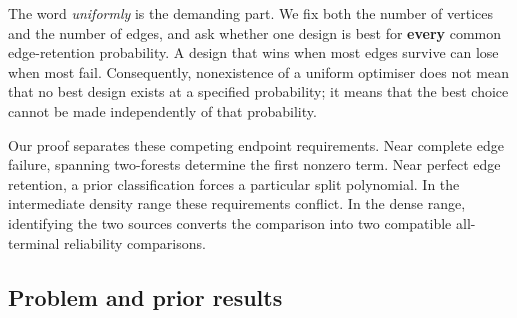\documentclass[
  11pt,
]{article}
\newcounter{none} %
\theoremstyle{definition}
\theoremstyle{remark}
\begin{document}
The word \emph{uniformly} is the demanding part. We fix both the number
of vertices and the number of edges, and ask whether one design is best
for \textbf{every} common edge-retention probability. A design that wins
when most edges survive can lose when most fail. Consequently,
nonexistence of a uniform optimiser does not mean that no best design
exists at a specified probability; it means that the best choice cannot
be made independently of that probability.

Our proof separates these competing endpoint requirements. Near complete
edge failure, spanning two-forests determine the first nonzero term.
Near perfect edge retention, a prior classification forces a particular
split polynomial. In the intermediate density range these requirements
conflict. In the dense range, identifying the two sources converts the
comparison into two compatible all-terminal reliability comparisons.

\subsection{Problem and prior results}\label{problem-and-prior-results}
\end{document}
